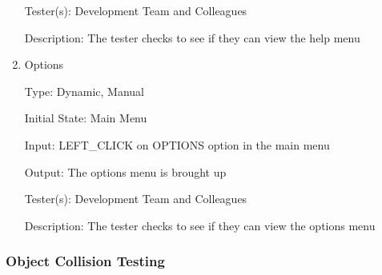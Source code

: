 \documentclass[12pt, titlepage]{article}
\begin{document}
\begin{enumerate}
Tester(s): Development Team and Colleagues

Description: The tester checks to see if they can view the help menu

\item{Options\\}

Type: Dynamic, Manual

Initial State: Main Menu

Input: LEFT\_CLICK on OPTIONS option in the main menu

Output: The options menu is brought up

Tester(s): Development Team and Colleagues

Description: The tester checks to see if they can view the options menu

\end{enumerate}

\subsubsection{Object Collision Testing}
\end{document}
